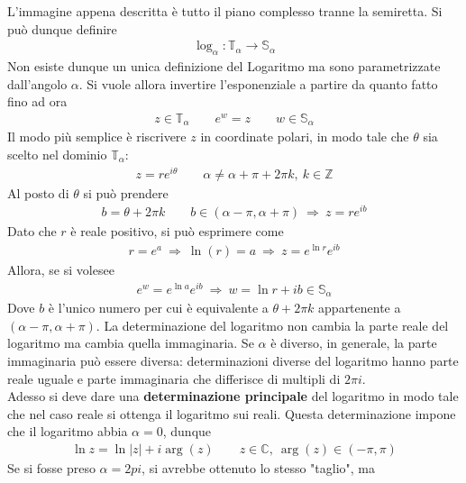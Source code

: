 \documentclass[a4paper, oneside]{article}
\begin{document}
L'immagine appena descritta è tutto il piano complesso tranne la semiretta. Si può dunque 
definire
\begin{align}
    \log_\alpha : \mathbb{T}_\alpha \to \mathbb{S}_\alpha
\end{align}
Non esiste dunque un unica definizione del Logaritmo ma sono 
parametrizzate dall'angolo $\alpha$. Si vuole allora invertire l'esponenziale 
a partire da quanto fatto fino ad ora
\begin{gather*}
    z \in \mathbb{T}_\alpha \qquad e^{w} = z \qquad w \in \mathbb{S}_\alpha
\end{gather*}
Il modo più semplice è riscrivere $z$ in coordinate polari, in modo 
tale che $\theta$ sia scelto nel dominio $\mathbb{T}_\alpha$:
\begin{gather*}
    z = re^{i\theta} \qquad \alpha \neq \alpha + \pi + 2 \pi  k, \ k \in \mathbb{Z}
\end{gather*}
Al posto di $\theta$ si può prendere 
\begin{gather*}
    b = \theta + 2\pi k \qquad b \in (\alpha - \pi, \alpha + \pi) \ \Longrightarrow \ z = re^{ib}
\end{gather*} 
Dato che $r$ è reale positivo, si può esprimere come
\begin{gather*}
    r = e^{a} \ \Longrightarrow \  \ln (r) = a \ \Longrightarrow \ z = e^{\ln r} e^{ib}
\end{gather*}
Allora, se si volesee 
\begin{gather*}
    e^{w} = e^{\ln a} e^{ib} \ \Longrightarrow \ \boxed{w = \ln r + ib } \in \mathbb{S}_\alpha
\end{gather*}
Dove $b$ è l'unico numero per cui è equivalente a $\theta + 2\pi k$ appartenente a
$(\alpha - \pi, \alpha + \pi)$. La determinazione del logaritmo non cambia la parte 
reale del logaritmo ma cambia quella immaginaria. Se $\alpha$ è diverso, in generale, 
la parte immaginaria può essere diversa: determinazioni diverse del logaritmo hanno 
parte reale uguale e parte immaginaria che differisce di multipli di $2\pi i$.  \\
Adesso si deve dare una \textbf{determinazione principale} del logaritmo in modo tale che 
nel caso reale si ottenga il logaritmo sui reali. Questa determinazione impone 
che il logaritmo abbia $\alpha = 0$, dunque
\begin{align}
    \ln z = \ln \left| z \right| + i\arg(z) \qquad z \in \mathbb{C}, \ \arg(z) \in (-\pi, \pi) 
\end{align}
Se si fosse preso $\alpha = 2pi$, si avrebbe ottenuto lo stesso "taglio", ma 
\end{document}
